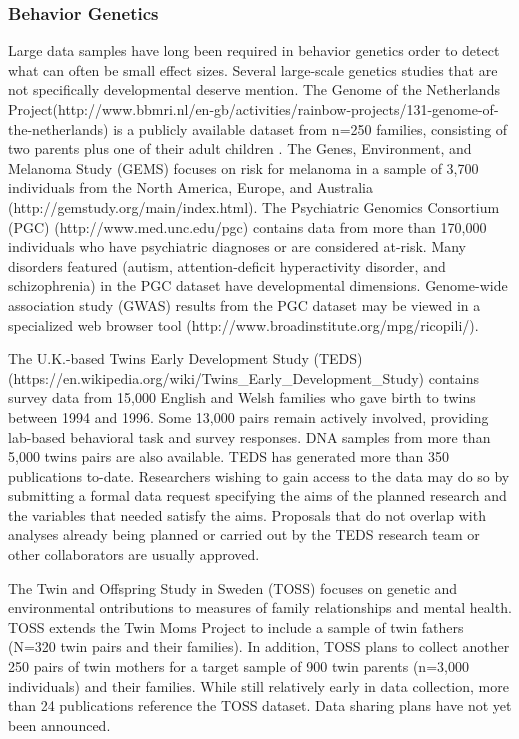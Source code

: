 \documentclass[letterpaper,man,apacite]{apa6}
\begin{document}
\subsubsection{Behavior Genetics}

Large data samples have long been required in behavior genetics order to detect what can often be small effect sizes.
Several large-scale genetics studies that are not specifically developmental deserve mention.
The Genome of the Netherlands Project(http://www.bbmri.nl/en-gb/activities/rainbow-projects/131-genome-of-the-netherlands) is a publicly available dataset from n=250 families, consisting of two parents plus one of their adult children \cite{Genome_Netherlands}.
The Genes, Environment, and Melanoma Study (GEMS) focuses on risk for melanoma in a sample of 3,700 individuals from the North America, Europe, and Australia (http://gemstudy.org/main/index.html).
The Psychiatric Genomics Consortium (PGC) (http://www.med.unc.edu/pgc) contains data from more than 170,000 individuals who have psychiatric diagnoses or are considered at-risk.
Many disorders featured (autism, attention-deficit hyperactivity disorder, and schizophrenia) in the PGC dataset have developmental dimensions.
Genome-wide association study (GWAS) results from the PGC dataset may be viewed in a specialized web browser tool (http://www.broadinstitute.org/mpg/ricopili/).

The U.K.-based Twins Early Development Study (TEDS) \cite{TEDS} (https://en.wikipedia.org/wiki/Twins_Early_Development_Study) contains survey data from 15,000 English and Welsh families who gave birth to twins between 1994 and 1996.
Some 13,000 pairs remain actively involved, providing lab-based behavioral task and survey responses.
DNA samples from more than 5,000 twins pairs are also available.
TEDS has generated more than 350 publications to-date.
Researchers wishing to gain access to the data may do so by submitting a formal data request specifying the aims of the planned research and the variables that needed satisfy the aims. 
Proposals that do not overlap with analyses already being planned or carried out by the TEDS research team or other collaborators are usually approved.

The Twin and Offspring Study in Sweden (TOSS) \cite{TOSS} focuses on genetic and environmental ontributions to measures of family relationships and mental health.
TOSS extends the Twin Moms Project to include a sample of twin fathers (N=320 twin pairs and their families).
In addition, TOSS plans to collect another 250 pairs of twin mothers for a target sample of 900 twin parents (n=3,000 individuals) and their families.
While still relatively early in data collection, more than 24 publications reference the TOSS dataset.
Data sharing plans have not yet been announced.
\end{document}
